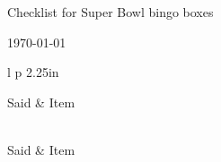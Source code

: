 \documentclass[12pt]{article}
\newcommand{\sep}{1mm}
\newcommand{\negsep}{-3mm}
\begin{document}
\begin{center}
\begin{Large}
Checklist for Super Bowl bingo boxes
\end{Large}
\vspace{0.15in}



\today

\end{center}

\begin{longtable}{l p {2.25in} }

Said  & Item \\[\sep]
\hline\\[\negsep]
\endfirsthead

Said  & Item \\[\sep]
\hline\\[\negsep]
\endhead

\hline\hline
\endfoot



\end{longtable}
\end{document}
